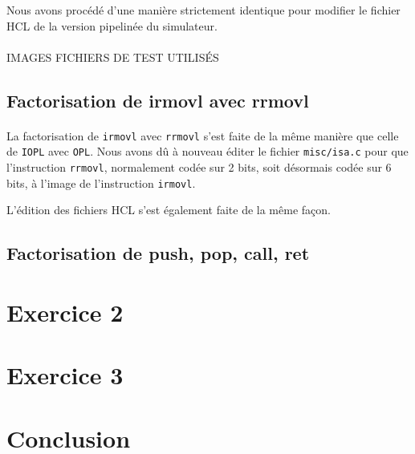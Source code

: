 \documentclass[12pt]{article}
\begin{document}
Nous avons procédé d'une manière strictement identique pour modifier le fichier HCL de la version pipelinée du simulateur.

\paragraph{}IMAGES FICHIERS DE TEST UTILISÉS


\subsection{Factorisation de irmovl avec rrmovl}
\paragraph{}La factorisation de \verb+irmovl+ avec \verb+rrmovl+ s'est faite de la même manière que celle de \verb+IOPL+ avec \verb+OPL+. Nous avons dû à nouveau éditer le fichier \verb+misc/isa.c+ pour que l'instruction \verb+rrmovl+, normalement codée sur 2 bits, soit désormais codée sur 6 bits, à l'image de l'instruction \verb+irmovl+.

L'édition des fichiers HCL s'est également faite de la même façon.

\subsection{Factorisation de push, pop, call, ret}


\section{Exercice 2}



\section{Exercice 3}

\section*{Conclusion}
\end{document}
